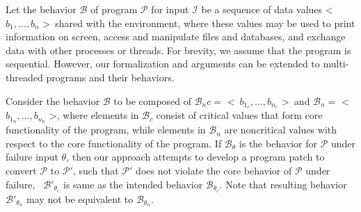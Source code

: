 Let the behavior $\mathcal{B}$ of program $\mathcal{P}$ for input $\mathcal{I}$
be a sequence of data values \textless\ $b_1, \ldots, b_n$ \textgreater\ shared
with the environment, where these values may be used to print information on
screen, access and manipulate files and databases, and exchange data with other
processes or threads. For brevity, we assume that the program is sequential.
However, our formalization and arguments can be extended to multi-threaded
programs and their behaviors.

Consider the behavior $\mathcal{B}$ to be composed of $\mathcal{B}_nc =$
\textless\ $b_{1_c}, \ldots, b_{n_c}$ \textgreater\ and $\mathcal{B}_n =$
\textless\ $b_{1_n}, \ldots, b_{n_n}$ \textgreater, where elements in
$\mathcal{B}_c$ consist of critical values that form core functionality of the program, while elements in
$\mathcal{B}_n$ are noncritical values with respect to the core functionality of
the program.
%  
% 
%  
% 
If $\mathcal{B}_{\theta}$ is the behavior for $\mathcal{P}$ under failure input
$\theta$, then our approach attempts to
develop a program patch to convert $\mathcal{P}$ to $\mathcal{P}'$,
such that 
 $\mathcal{P}'$ does not violate the core behavior of $\mathcal{P}$ under
failure, \ie\ $\mathcal{B}'_{\theta_c}$ is same as the intended behavior
$\mathcal{B}_{\theta_c}$.
Note that resulting behavior $\mathcal{B}'_{\theta_n}$ may not be
equivalent to $\mathcal{B}_{\theta_n}$.

